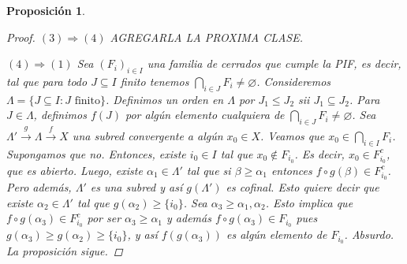 \documentclass[12pt]{book}
\newtheorem{prop}[teo]{Proposición}
\theoremstyle{definition}
\let\emptyset\varnothing
\begin{document}
\begin{prop}
\begin{proof}
$(3)\Longrightarrow(4)$ AGREGARLA LA PROXIMA CLASE.

$(4)\Longrightarrow(1)$ Sea $(F_i)_{i\in I}$ una familia de cerrados que cumple la PIF, es decir, tal que para todo $J\subseteq I$ finito tenemos $\displaystyle\bigcap_{i\in J} F_i \neq \emptyset$. Consideremos $\Lambda=\{J\subseteq I : J\text{ finito}\}$. Definimos un orden en $\Lambda$ por $J_1\leq J_2$ sii $J_1\subseteq J_2$. Para $J\in\Lambda$, definimos $f(J)$ por algún elemento cualquiera de $\displaystyle\bigcap_{i\in J}F_i \neq\emptyset$. Sea $\Lambda'\stackrel{g}{\longrightarrow}\Lambda\stackrel{f}{\longrightarrow}X$ una subred convergente a algún $x_0\in X$. Veamos que $x_0\in\displaystyle\bigcap_{i\in I}F_i$. Supongamos que no. Entonces, existe $i_0\in I$ tal que $x_0\notin F_{i_0}$. Es decir, $x_0\in F_{i_0}^c$, que es abierto. Luego, existe $\alpha_1\in\Lambda'$ tal que si $\beta\geq\alpha_1$ entonces $f\circ g(\beta)\in F_{i_0}^c$. Pero además, $\Lambda'$ es una subred y así $g(\Lambda')$ es cofinal. Esto quiere decir que existe $\alpha_2\in\Lambda'$ tal que $g(\alpha_2)\geq \{i_0\}$. Sea $\alpha_3\geq \alpha_1,\alpha_2$. Esto implica que $f\circ g(\alpha_3)\in F_{i_0}^c$ por ser $\alpha_3\geq \alpha_1$ y además $f\circ g(\alpha_3) \in F_{i_0}$ pues $g(\alpha_3)\geq g(\alpha_2)\geq \{i_0\}$, y así $f(g(\alpha_3))$ es algún elemento de $F_{i_0}$. Absurdo. La proposición sigue.

\end{proof}
\end{prop}
\end{document}
